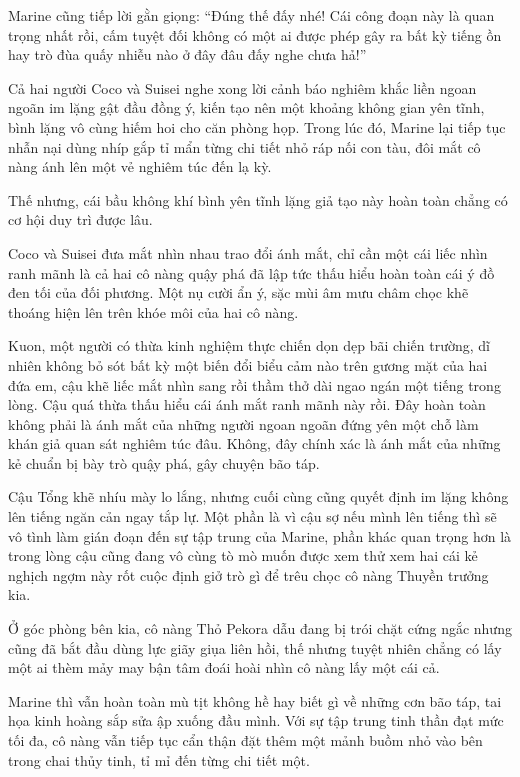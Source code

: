\documentclass[../main.tex]{subfiles}
\begin{document}
Marine cũng tiếp lời gằn giọng: ``Đúng thế đấy nhé! Cái công đoạn này là quan trọng nhất rồi, cấm tuyệt đối không có một ai được phép gây ra bất kỳ tiếng ồn hay trò đùa quấy nhiễu nào ở đây đâu đấy nghe chưa hả!''

Cả hai người Coco và Suisei nghe xong lời cảnh báo nghiêm khắc liền ngoan ngoãn im lặng gật đầu đồng ý, kiến tạo nên một khoảng không gian yên tĩnh, bình lặng vô cùng hiếm hoi cho căn phòng họp. Trong lúc đó, Marine lại tiếp tục nhẫn nại dùng nhíp gắp tỉ mẩn từng chi tiết nhỏ ráp nối con tàu, đôi mắt cô nàng ánh lên một vẻ nghiêm túc đến lạ kỳ.

Thế nhưng, cái bầu không khí bình yên tĩnh lặng giả tạo này hoàn toàn chẳng có cơ hội duy trì được lâu.

Coco và Suisei đưa mắt nhìn nhau trao đổi ánh mắt, chỉ cần một cái liếc nhìn ranh mãnh là cả hai cô nàng quậy phá đã lập tức thấu hiểu hoàn toàn cái ý đồ đen tối của đối phương. Một nụ cười ẩn ý, sặc mùi âm mưu châm chọc khẽ thoáng hiện lên trên khóe môi của hai cô nàng.


Kuon, một người có thừa kinh nghiệm thực chiến dọn dẹp bãi chiến trường, dĩ nhiên không bỏ sót bất kỳ một biến đổi biểu cảm nào trên gương mặt của hai đứa em, cậu khẽ liếc mắt nhìn sang rồi thầm thở dài ngao ngán một tiếng trong lòng. Cậu quá thừa thấu hiểu cái ánh mắt ranh mãnh này rồi. Đây hoàn toàn không phải là ánh mắt của những người ngoan ngoãn đứng yên một chỗ làm khán giả quan sát nghiêm túc đâu. Không, đây chính xác là ánh mắt của những kẻ chuẩn bị bày trò quậy phá, gây chuyện bão táp.

Cậu Tổng khẽ nhíu mày lo lắng, nhưng cuối cùng cũng quyết định im lặng không lên tiếng ngăn cản ngay tắp lự. Một phần là vì cậu sợ nếu mình lên tiếng thì sẽ vô tình làm gián đoạn đến sự tập trung của Marine, phần khác quan trọng hơn là trong lòng cậu cũng đang vô cùng tò mò muốn được xem thử xem hai cái kẻ nghịch ngợm này rốt cuộc định giở trò gì để trêu chọc cô nàng Thuyền trưởng kia.

Ở góc phòng bên kia, cô nàng Thỏ Pekora dẫu đang bị trói chặt cứng ngắc nhưng cũng đã bắt đầu dùng lực giãy giụa liên hồi, thế nhưng tuyệt nhiên chẳng có lấy một ai thèm mảy may bận tâm đoái hoài nhìn cô nàng lấy một cái cả.

Marine thì vẫn hoàn toàn mù tịt không hề hay biết gì về những cơn bão táp, tai họa kinh hoàng sắp sửa ập xuống đầu mình. Với sự tập trung tinh thần đạt mức tối đa, cô nàng vẫn tiếp tục cẩn thận đặt thêm một mảnh buồm nhỏ vào bên trong chai thủy tinh, tỉ mỉ đến từng chi tiết một.
\end{document}
